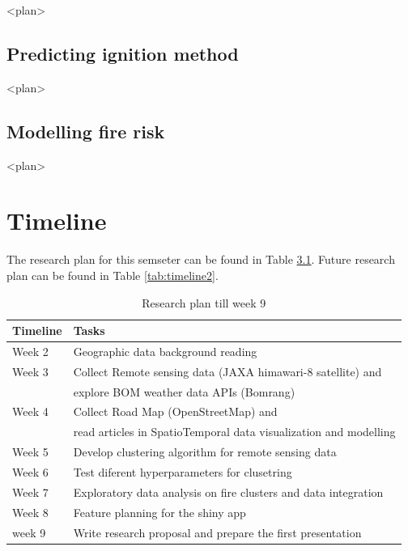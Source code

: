 \documentclass{monashthesis}
\begin{document}
\textless plan\textgreater{}

\hypertarget{predicting-ignition-method}{%
\section{Predicting ignition method}\label{predicting-ignition-method}}

\textless plan\textgreater{}

\hypertarget{modelling-fire-risk}{%
\section{Modelling fire risk}\label{modelling-fire-risk}}

\textless plan\textgreater{}

\hypertarget{timeline}{%
\chapter{Timeline}\label{timeline}}

The research plan for this semseter can be found in Table \ref{tab:timeline1}. Future research plan can be found in Table \ref{tab:timeline2}.

\begin{table}[!h]

\caption{\label{tab:timeline1}Research plan till week 9}
\centering
\begin{tabular}[t]{ll}
\toprule
Timeline & Tasks\\
\midrule
Week 2 & Geographic data background reading\\
Week 3 & Collect Remote sensing data (JAXA himawari-8 satellite) and\\
 & explore BOM weather data APIs (Bomrang)\\
Week 4 & Collect Road Map (OpenStreetMap) and\\
 & read articles in SpatioTemporal data visualization and modelling\\
\addlinespace
Week 5 & Develop clustering algorithm for remote sensing data\\
Week 6 & Test diferent hyperparameters for clusetring\\
Week 7 & Exploratory data analysis on fire clusters and data integration\\
Week 8 & Feature planning for the shiny app\\
week 9 & Write research proposal and prepare the first presentation\\
\bottomrule
\end{tabular}
\end{table}
\end{document}
